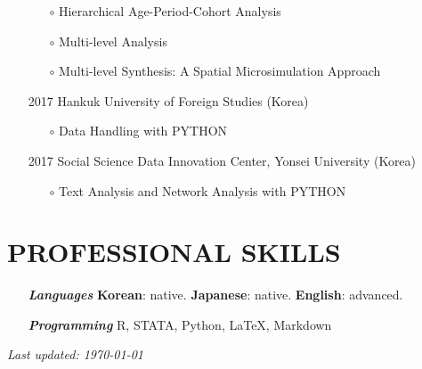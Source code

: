 \documentclass[11pt]{res} %
\begin{document}
\begin{resume}
\begin{itemize}[wide = 0pt]
\begin{itemize}
		\item[$\circ$] Hierarchical Age-Period-Cohort Analysis
		\item[$\circ$] Multi-level Analysis
		\item[$\circ$] Multi-level Synthesis: A Spatial Microsimulation Approach
	\end{itemize}
	\item[2017] Hankuk University of Foreign Studies (Korea)
	\begin{itemize} \itemsep -2pt 
		\item[$\circ$] Data Handling with PYTHON 
	\end{itemize}		
	\item[2017] Social Science Data Innovation Center, Yonsei University (Korea)
	\begin{itemize}
		\item[$\circ$] Text Analysis and Network Analysis with PYTHON 
	\end{itemize}
\end{itemize}

\section{PROFESSIONAL SKILLS}
\begin{itemize}[wide=0pt]
	\item[\textit{\bf Languages}] \textbf{Korean}: native. \textbf{Japanese}: native. \textbf{English}: advanced.
	\item[\textit{\bf Programming}] R, STATA, Python, \LaTeX, Markdown
\end{itemize}
\mbox{}
\vfill
\centering \textit{Last updated: \today}

\end{resume}
\end{document}
